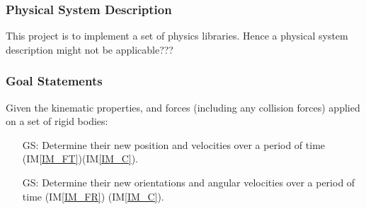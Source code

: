 \documentclass[12pt]{article}
\newcounter{goalnum} %
\newcommand{\progname}{Tamias2D}
\begin{document}
\subsubsection{Physical System Description}






This project is to implement a set of physics libraries. Hence a physical system description might not be applicable???

\subsubsection{Goal Statements}
Given the kinematic properties, and forces (including any collision forces) applied on a set of rigid bodies: 

\begin{itemize}
	
\item[GS\refstepcounter{goalnum}\thegoalnum \label{G_linear}:] Determine their new position and velocities over a 
period of time (IM\ref{IM_FT})(IM\ref{IM_C}).

\item[GS\refstepcounter{goalnum}\thegoalnum \label{G_angular}:] Determine their new orientations and angular 
velocities over a period of time (IM\ref{IM_FR}) (IM\ref{IM_C}).
 



\end{itemize}
\end{document}
